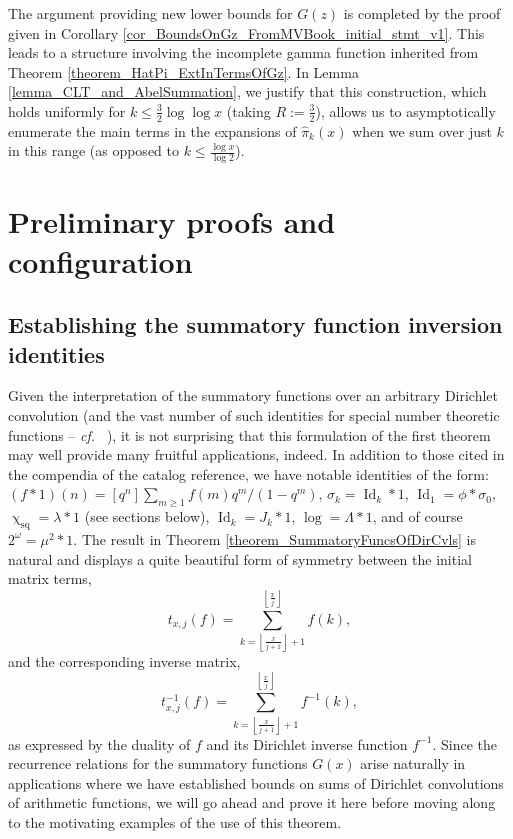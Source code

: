 \documentclass[11pt,reqno,a4letter]{article}
\numberwithin{figure}{section}
\numberwithin{table}{section}
\newcommand{\cf}{\textit{cf.\ }}
\newcommand{\floor}[1]{\left\lfloor #1 \right\rfloor}
\renewcommand{\chi}{\upchi}
\theoremstyle{plain}
\numberwithin{theorem}{section}
\theoremstyle{definition}
\begin{document}
The argument providing new lower bounds for $G(z)$ is completed by the 
proof given in Corollary \ref{cor_BoundsOnGz_FromMVBook_initial_stmt_v1}. 
This leads to a structure involving the 
incomplete gamma function inherited from Theorem \ref{theorem_HatPi_ExtInTermsOfGz}. 
In Lemma \ref{lemma_CLT_and_AbelSummation}, we justify that this construction, 
which holds uniformly for $k \leq \frac{3}{2} \log\log x$ (taking $R := \frac{3}{2}$), 
allows us to asymptotically enumerate the main terms 
in the expansions of $\widehat{\pi}_k(x)$ when we sum over just $k$ in this range 
(as opposed to $k \leq \frac{\log x}{\log 2}$). 

\newpage 
\section{Preliminary proofs and configuration} 
\label{Section_PrelimProofs_Config} 

\subsection{Establishing the summatory function inversion identities} 

Given the interpretation of the summatory functions over an arbitrary Dirichlet convolution 
(and the vast number of such identities for special number theoretic functions -- \cf 
\cite{CATALOG-INTDIRSERIES,CATALOG-LAMBERTSERIES}), it is not surprising that this formulation of the first theorem 
may well provide many fruitful applications, indeed. In addition to those cited in the 
compendia of the catalog reference, we have notable identities of the form: 
$(f \ast 1)(n) = [q^n] \sum_{m \geq 1} f(m) q^m / (1-q^m)$, 
$\sigma_k = \operatorname{Id}_k \ast 1$, $\operatorname{Id}_1 = \phi \ast \sigma_0$, 
$\chi_{\operatorname{sq}} = \lambda \ast 1$ (see sections below), 
$\operatorname{Id}_k = J_k \ast 1$, $\log = \Lambda \ast 1$, and of course 
$2^{\omega} = \mu^2 \ast 1$. 
The result in Theorem \ref{theorem_SummatoryFuncsOfDirCvls} is 
natural and displays a quite beautiful form of symmetry between the 
initial matrix terms, $$t_{x,j}(f) = \sum_{k=\floor{\frac{x}{j+1}}+1}^{\floor{\frac{x}{j}}} f(k),$$ and the 
corresponding inverse matrix, $$t_{x,j}^{-1}(f) = \sum_{k=\floor{\frac{x}{j+1}}+1}^{\floor{\frac{x}{j}}} f^{-1}(k),$$ 
as expressed by the duality of $f$ and its Dirichlet inverse function $f^{-1}$. Since the recurrence relations for the 
summatory functions $G(x)$ arise naturally in applications where we have established bounds on sums of 
Dirichlet convolutions of arithmetic functions, we will go ahead and prove it here before moving along to the 
motivating examples of the use of this theorem. 
\end{document}
